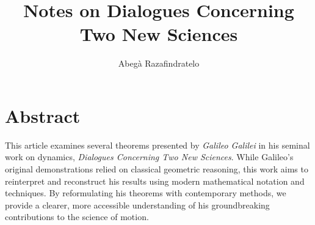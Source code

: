 \documentclass{article}
\author{Abegà Razafindratelo}
\title{Notes on Dialogues Concerning Two New Sciences}
\begin{document}
\maketitle

\section*{Abstract}
 
\qquad	This article examines several theorems presented by \textit{Galileo Galilei} in his seminal work on dynamics, \textit{Dialogues Concerning Two New Sciences}\cite{galilei_two_new_sciences}. While Galileo’s original demonstrations relied on classical geometric reasoning, this work aims to reinterpret and reconstruct his results using modern mathematical notation and techniques. By reformulating his theorems with contemporary methods, we provide a clearer, more accessible understanding of his groundbreaking contributions to the science of motion.









\end{document}
